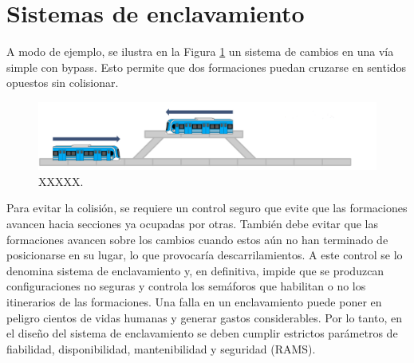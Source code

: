 \section{Sistemas de enclavamiento}

\label{sec:petri}

A modo de ejemplo, se ilustra en la Figura \ref{fig:enclavamiento} un sistema de cambios en una vía simple con bypass. Esto permite que dos formaciones puedan cruzarse en sentidos opuestos sin colisionar.

    \begin{figure}[!h]
        \centering
        \includegraphics[width=1\textwidth]{Figuras/bypass}
        \centering\caption{XXXXX.}
        \label{fig:enclavamiento}
    \end{figure}

Para evitar la colisión, se requiere un control seguro que evite que las formaciones avancen hacia secciones ya ocupadas por otras. También debe evitar que las formaciones avancen sobre los cambios cuando estos aún no han terminado de posicionarse en su lugar, lo que provocaría descarrilamientos. A este control se lo denomina sistema de enclavamiento y, en definitiva, impide que se produzcan configuraciones no seguras y controla los semáforos que habilitan o no los itinerarios de las formaciones. Una falla en un enclavamiento puede poner en peligro cientos de vidas humanas y generar gastos considerables. Por lo tanto, en el diseño del sistema de enclavamiento se deben cumplir estrictos parámetros de fiabilidad, disponibilidad, mantenibilidad y seguridad (RAMS).
    





